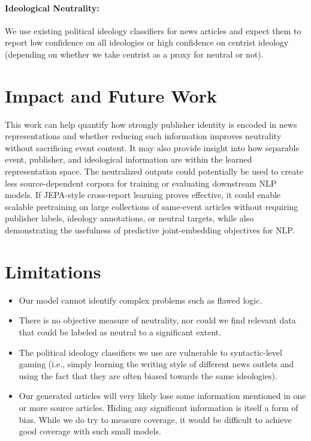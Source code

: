 \documentclass[11pt]{article}
\begin{document}
\paragraph{Ideological Neutrality:} We use existing political ideology classifiers for news articles and expect them to report low confidence on all ideologies or high confidence on centrist ideology (depending on whether we take centrist as a proxy for neutral or not).

\section{Impact and Future Work}

This work can help quantify how strongly publisher identity is encoded in news representations and whether reducing such information improves neutrality without sacrificing event content. It may also provide insight into how separable event, publisher, and ideological information are within the learned representation space. The neutralized outputs could potentially be used to create less source-dependent corpora for training or evaluating downstream NLP models. If JEPA-style cross-report learning proves effective, it could enable scalable pretraining on large collections of same-event articles without requiring publisher labels, ideology annotations, or neutral targets, while also demonstrating the usefulness of predictive joint-embedding objectives for NLP.

\section{Limitations}

\begin{itemize}
\item Our model cannot identify complex problems such as flawed logic.
\item There is no objective measure of neutrality, nor could we find relevant data that could be labeled as neutral to a significant extent.
\item The political ideology classifiers we use are vulnerable to syntactic-level gaming (i.e., simply learning the writing style of different news outlets and using the fact that they are often biased towards the same ideologies).
\item Our generated articles will very likely lose some information mentioned in one or more source articles. Hiding any significant information is itself a form of bias. While we do try to measure coverage, it would be difficult to achieve good coverage with such small models.
\end{itemize}
\end{document}
